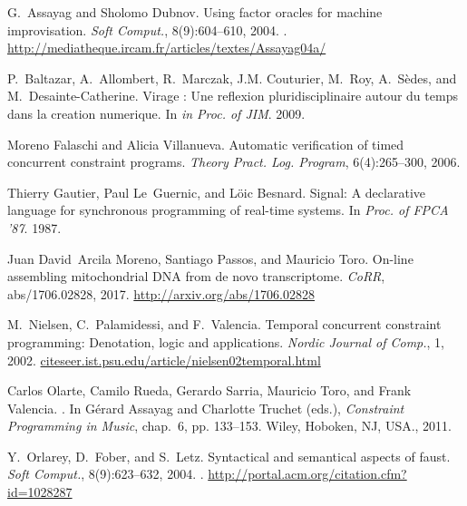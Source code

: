 \documentclass[]{lipics-iclp}
\theoremstyle{plain}\newtheorem{mainthm}[thm]{Main Theorem}
\theoremstyle{definition}\newtheorem{crucialdef}[thm]{Crucial Definition}
\begin{document}
\begin{thebibliography}{{Tor}16a}
G.~Assayag and Sholomo Dubnov.
\newblock Using factor oracles for machine improvisation.
\newblock \emph{Soft Comput.}, 8(9):604--610, 2004.
\newblock {}.
\newline\urlprefix\url{http://mediatheque.ircam.fr/articles/textes/Assayag04a/}

P.~Baltazar, A.~Allombert, R.~Marczak, J.M. Couturier, M.~Roy, A.~S{\`e}des,
  and M.~Desainte-Catherine.
\newblock Virage : Une reflexion pluridisciplinaire autour du temps dans la
  creation numerique.
\newblock In \emph{in Proc. of JIM}. 2009.

Moreno Falaschi and Alicia Villanueva.
\newblock Automatic verification of timed concurrent constraint programs.
\newblock \emph{Theory Pract. Log. Program}, 6(4):265--300, 2006.

Thierry Gautier, Paul Le~Guernic, and L\"{o}ic Besnard.
\newblock Signal: A declarative language for synchronous programming of
  real-time systems.
\newblock In \emph{Proc. of FPCA '87}. 1987.

Juan David~Arcila Moreno, Santiago Passos, and Mauricio Toro.
\newblock On-line assembling mitochondrial {DNA} from de novo transcriptome.
\newblock \emph{CoRR}, abs/1706.02828, 2017.
\newline\urlprefix\url{http://arxiv.org/abs/1706.02828}

M.~Nielsen, C.~Palamidessi, and F.~Valencia.
\newblock Temporal concurrent constraint programming: Denotation, logic and
  applications.
\newblock \emph{Nordic Journal of Comp.}, 1, 2002.
\newline\urlprefix\url{citeseer.ist.psu.edu/article/nielsen02temporal.html}

Carlos Olarte, Camilo Rueda, Gerardo Sarria, Mauricio Toro, and Frank Valencia.
.
\newblock In G{\'e}rard Assayag and Charlotte Truchet (eds.), \emph{{Constraint
  Programming in Music}}, chap.~6, pp. 133--153. Wiley, Hoboken, NJ, USA.,
  2011.

Y.~Orlarey, D.~Fober, and S.~Letz.
\newblock Syntactical and semantical aspects of faust.
\newblock \emph{Soft Comput.}, 8(9):623--632, 2004.
\newblock {}.
\newline\urlprefix\url{http://portal.acm.org/citation.cfm?id=1028287}


\end{thebibliography}
\end{document}
